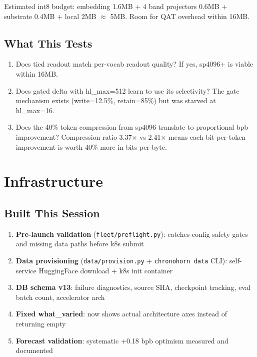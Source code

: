 \documentclass[11pt,a4paper]{report}
\begin{document}
Estimated int8 budget: embedding 1.6MB + 4 band projectors 0.6MB + substrate 0.4MB + local 2MB $\approx$ 5MB. Room for QAT overhead within 16MB.

\section{What This Tests}

\begin{enumerate}
\item Does tied readout match per-vocab readout quality? If yes, sp4096+ is viable within 16MB.
\item Does gated delta with hl\_max=512 learn to use its selectivity? The gate mechanism exists (write=12.5\%, retain=85\%) but was starved at hl\_max=16.
\item Does the 40\% token compression from sp4096 translate to proportional bpb improvement? Compression ratio 3.37$\times$ vs 2.41$\times$ means each bit-per-token improvement is worth 40\% more in bits-per-byte.
\end{enumerate}

\chapter{Infrastructure}

\section{Built This Session}

\begin{enumerate}
\item \textbf{Pre-launch validation} (\texttt{fleet/preflight.py}): catches config safety gates and missing data paths before k8s submit
\item \textbf{Data provisioning} (\texttt{data/provision.py} + \texttt{chronohorn data} CLI): self-service HuggingFace download + k8s init container
\item \textbf{DB schema v13}: failure diagnostics, source SHA, checkpoint tracking, eval batch count, accelerator arch
\item \textbf{Fixed what\_varied}: now shows actual architecture axes instead of returning empty
\item \textbf{Forecast validation}: systematic +0.18 bpb optimism measured and documented
\end{enumerate}
\end{document}
